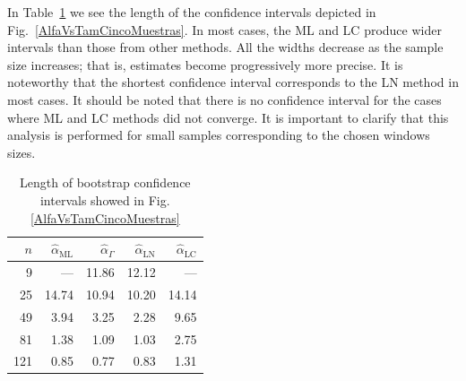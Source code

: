 \documentclass[twocolumn]{svjour3}
\begin{document}
In Table~\ref{tab:LongIC} we see the length of the confidence intervals depicted in Fig.~\ref{AlfaVsTamCincoMuestras}.
In most cases, the ML and LC produce wider intervals than those from other methods. 
All the widths decrease as the sample size increases; that is, estimates become progressively more precise. 
It is noteworthy that the shortest confidence interval corresponds to the LN method in most cases. 
It should be noted that there is no confidence interval for the cases where ML and LC methods did not converge.
It is important to clarify that this analysis is performed for small samples corresponding to the chosen windows sizes. 

\begin{table}[htb]
	\centering
	\caption{\label{tab:LongIC}Length of bootstrap confidence intervals showed in Fig.\ref{AlfaVsTamCincoMuestras}}
	\begin{tabular}{*5{r}}
		\toprule 
		$n$     &  $\widehat{\alpha}_{\text{{ML}}}$    &  $\widehat{\alpha}_{\Gamma}$  &  $\widehat{\alpha}_{\text{{LN}}}$ &  $\widehat{\alpha}_{\text{{LC}}}$ \\
		\midrule
		9     &    ---  & 11.86 & 12.12 & --- \\
		25    & 14.74 & 10.94 & 10.20 & 14.14 \\
		49    & 3.94  & 3.25  & 2.28  & 9.65 \\
		81    & 1.38  & 1.09  & 1.03  & 2.75 \\
		121   & 0.85  & 0.77  & 0.83  & 1.31 \\
		\bottomrule
	\end{tabular}
\end{table}%



\end{document}
